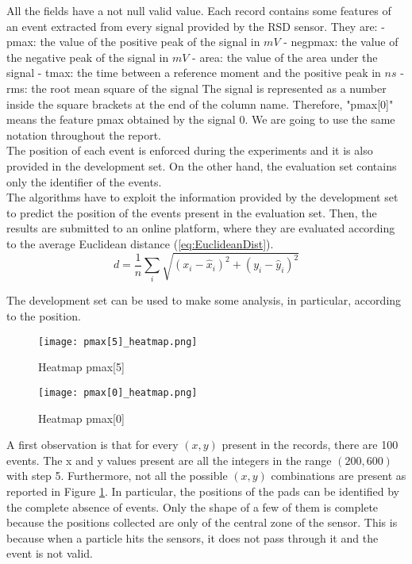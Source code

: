 \documentclass[conference]{IEEEtran}
\begin{document}
All the fields have a not null valid value. Each record contains some features of an event extracted from every signal provided by the RSD sensor. They are:
\label{lst:typeFeature}
- pmax: the value of the positive peak of the signal in $mV$
- negpmax: the value of the negative peak of the signal in $mV$
- area: the value of the area under the signal
- tmax: the time between a reference moment and the positive peak in $ns$
- rms: the root mean square of the signal
The signal is represented as a number inside the square brackets at the end of the column name. Therefore, "pmax[0]" means the feature pmax obtained by the signal 0. We are going to use the same notation throughout the report.\\
The position of each event is enforced during the experiments and it is also provided in the development set. On the other hand, the evaluation set contains only the identifier of the events. \\

The algorithms have to exploit the information provided by the development set to predict the position of the events present in the evaluation set. Then, the results are submitted to an online platform, where they are evaluated according to the average Euclidean distance (\ref{eq:EuclideanDist}).
\begin{equation}
    \label{eq:EuclideanDist}
    d=\frac{1}{n} \sum_i \sqrt{(x_i-\hat{x}_i)^2+(y_i-\hat{y}_i)^2}
\end{equation} 

The development set can be used to make some analysis, in particular, according to the position.\\
\begin{figure}[htbp]
\centerline{\texttt{[image: pmax[5]\_heatmap.png]}}
\caption{Heatmap pmax[5]}
\label{fig:pmax[5]_heatmap}
\end{figure}
\begin{figure}[htbp]
\centerline{\texttt{[image: pmax[0]\_heatmap.png]}}
\caption{Heatmap pmax[0]}
\label{fig:pmax[0]_heatmap}
\end{figure}
A first observation is that for every $(x, y)$ present in the records, there are 100 events. The x and y values present are all the integers in the range $(200, 600)$ with step 5. Furthermore, not all the possible $(x, y)$ combinations are present as reported in Figure 
\ref{fig:pmax[5]_heatmap}. In particular, the positions of the pads can be identified by the complete absence of events. Only the shape of a few of them is complete because the positions collected are only of the central zone of the sensor. This is because when a particle hits the sensors, it does not pass through it and the event is not valid. \\%
\end{document}

